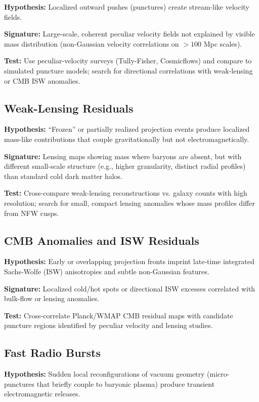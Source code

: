 \documentclass[11pt,a4paper]{article}
\begin{document}
\textbf{Hypothesis:} Localized outward pushes (punctures) create stream-like velocity fields.

\textbf{Signature:} Large-scale, coherent peculiar velocity fields not explained by visible mass distribution (non-Gaussian velocity correlations on $>100$ Mpc scales).

\textbf{Test:} Use peculiar-velocity surveys (Tully-Fisher, Cosmicflows) and compare to simulated puncture models; search for directional correlations with weak-lensing or CMB ISW anomalies.

\subsection{Weak-Lensing Residuals}

\textbf{Hypothesis:} ``Frozen'' or partially realized projection events produce localized mass-like contributions that couple gravitationally but not electromagnetically.

\textbf{Signature:} Lensing maps showing mass where baryons are absent, but with different small-scale structure (e.g., higher granularity, distinct radial profiles) than standard cold dark matter halos.

\textbf{Test:} Cross-compare weak-lensing reconstructions vs. galaxy counts with high resolution; search for small, compact lensing anomalies whose mass profiles differ from NFW cusps.

\subsection{CMB Anomalies and ISW Residuals}

\textbf{Hypothesis:} Early or overlapping projection fronts imprint late-time integrated Sachs-Wolfe (ISW) anisotropies and subtle non-Gaussian features.

\textbf{Signature:} Localized cold/hot spots or directional ISW excesses correlated with bulk-flow or lensing anomalies.

\textbf{Test:} Cross-correlate Planck/WMAP CMB residual maps with candidate puncture regions identified by peculiar velocity and lensing studies.

\subsection{Fast Radio Bursts}

\textbf{Hypothesis:} Sudden local reconfigurations of vacuum geometry (micro-punctures that briefly couple to baryonic plasma) produce transient electromagnetic releases.
\end{document}

